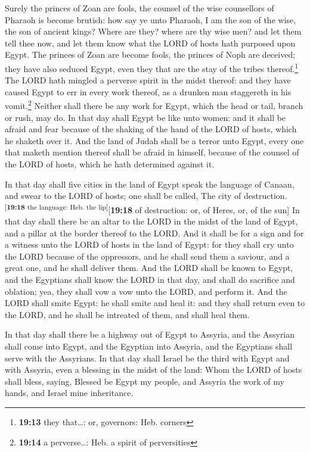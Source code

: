  Surely the princes of Zoan are fools, the counsel of the
wise counsellors of Pharaoh is become brutish: how say ye unto Pharaoh,
I am the son of the wise, the son of ancient kings? 
Where are they? where are thy wise men? and let them tell thee now, and
let them know what the LORD of hosts hath purposed upon Egypt.
 The princes of Zoan are become fools, the princes of
Noph are deceived; they have also seduced Egypt, even they that are the
stay of the tribes thereof.\footnote{\textbf{19:13} they that\ldots: or,
  governors: Heb. corners}  The LORD hath mingled a
perverse spirit in the midst thereof: and they have caused Egypt to err
in every work thereof, as a drunken man staggereth in his
vomit.\footnote{\textbf{19:14} a perverse\ldots: Heb. a spirit of
  perversities}  Neither shall there be any work for
Egypt, which the head or tail, branch or rush, may do. 
In that day shall Egypt be like unto women: and it shall be afraid and
fear because of the shaking of the hand of the LORD of hosts, which he
shaketh over it.  And the land of Judah shall be a terror
unto Egypt, every one that maketh mention thereof shall be afraid in
himself, because of the counsel of the LORD of hosts, which he hath
determined against it.

 In that day shall five cities in the land of Egypt speak
the language of Canaan, and swear to the LORD of hosts; one shall be
called, The city of destruction.\textsuperscript{{[}\textbf{19:18} the
language: Heb. the lip{]}}{[}\textbf{19:18} of destruction: or, of
Heres, or, of the sun{]}  In that day shall there be an
altar to the LORD in the midst of the land of Egypt, and a pillar at the
border thereof to the LORD.  And it shall be for a sign
and for a witness unto the LORD of hosts in the land of Egypt: for they
shall cry unto the LORD because of the oppressors, and he shall send
them a saviour, and a great one, and he shall deliver them.
 And the LORD shall be known to Egypt, and the Egyptians
shall know the LORD in that day, and shall do sacrifice and oblation;
yea, they shall vow a vow unto the LORD, and perform it. 
And the LORD shall smite Egypt: he shall smite and heal it: and they
shall return even to the LORD, and he shall be intreated of them, and
shall heal them.

 In that day shall there be a highway out of Egypt to
Assyria, and the Assyrian shall come into Egypt, and the Egyptian into
Assyria, and the Egyptians shall serve with the Assyrians.
 In that day shall Israel be the third with Egypt and
with Assyria, even a blessing in the midst of the land: 
Whom the LORD of hosts shall bless, saying, Blessed be Egypt my people,
and Assyria the work of my hands, and Israel mine inheritance.

